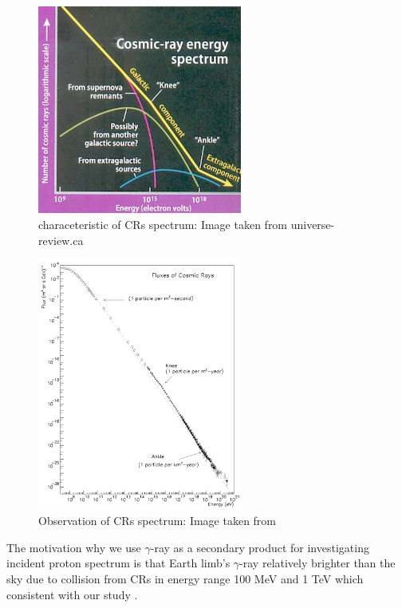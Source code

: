 \begin{figure}[h!]
  \centering
  \includegraphics[width=0.6\textwidth]{img/cr_feature_ref_university-review_ca}
  \caption{characeteristic of CRs spectrum: Image taken from universe-review.ca}
  \label{fig:cr_overview_spectrum}
\end{figure}
\begin{figure}[h!]
    \centering
    \includegraphics[width=0.6\textwidth]{img/Swordy}
    \caption{Observation of CRs spectrum: Image taken from \citet{Swordy2001}}
    \label{fig:cr_famous_spectrum}
\end{figure}

\par The motivation why we use $\gamma$-ray as a secondary product for investigating incident proton spectrum is that Earth limb's $\gamma$-ray relatively brighter than the sky due to collision from CRs in energy range 100 MeV and 1 TeV which consistent with our study \cite{Warit2009}.

